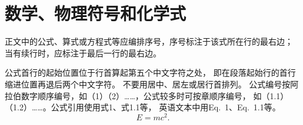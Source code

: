 \section{数学、物理符号和化学式}
正文中的公式、算式或方程式等应编排序号，序号标注于该式所在行的最右边；
当有续行时，应标注于最后一行的最右边。

公式首行的起始位置位于行首算起第五个中文字符之处，
即在段落起始行的首行缩进位置再退后两个中文字符。
不要用居中、居左或居行首排列。
公式编号按阿拉伯数字顺序编号，如（1）（2）……，公式较多时可按章顺序编号，
如（1.1）（1.2）……。公式引用使用式1、式1.1等，
英语文本中用Eq.~1、Eq.~1.1等。
\begin{equation}\label{eq:einstein}
  E=mc^2.
\end{equation}
